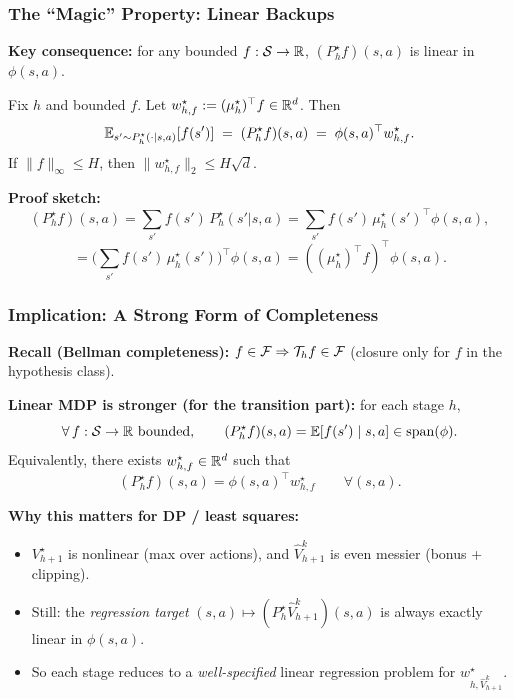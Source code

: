 \documentclass[aspectratio=169]{beamer}
\begin{document}
\begin{frame}\frametitle{The ``Magic'' Property: Linear Backups}

\small
\textbf{Key consequence:} for any bounded $f:\mathcal{S}\to\mathbb{R}$, $(P_h^\star f)(s,a)$ is linear in $\phi(s,a)$.

\vspace{0.03cm}
\begin{lemma}\label{lem:linearize_Pf_slides}
Fix $h$ and bounded $f$. Let $w_{h,f}^\star := (\mu_h^\star)^\top f\in\mathbb{R}^d$. Then
\[
\mathbb{E}_{s'\sim P_h^\star(\cdot\mid s,a)}[f(s')] \;=\; (P_h^\star f)(s,a)
\;=\;
\phi(s,a)^\top w_{h,f}^\star.
\]
If $\|f\|_\infty\le H$, then $\|w_{h,f}^\star\|_2\le H\sqrt d$.
\end{lemma}

\vspace{0.03cm}
\pause
\textbf{Proof sketch:}
\[
(P_h^\star f)(s,a)=\sum_{s'} f(s')\,P_h^\star(s'|s,a)
=\sum_{s'} f(s')\,\mu_h^\star(s')^\top \phi(s,a),
\]
\[
=\Big(\sum_{s'} f(s')\,\mu_h^\star(s')\Big)^\top \phi(s,a)
=( (\mu_h^\star)^\top f)^\top \phi(s,a).
\]

\end{frame}

\begin{frame}\frametitle{Implication: A Strong Form of Completeness}

\small
\textbf{Recall (Bellman completeness):}\;
$f\in\mathcal{F} \Rightarrow \mathcal{T}_h f \in \mathcal{F}$ \quad (closure only for $f$ in the hypothesis class).

\vspace{0.15cm}
\pause
\textbf{Linear MDP is stronger (for the transition part):}\;
for each stage $h$,
\[
\forall\, f:\Scal\to\R \ \text{bounded},\qquad
(P_h^\star f)(s,a)=\E[f(s')\mid s,a]\in \mathrm{span}(\phi).
\]
Equivalently, there exists $w_{h,f}^\star\in\mathbb{R}^d$ such that
\[
(P_h^\star f)(s,a)=\phi(s,a)^\top w_{h,f}^\star \qquad \forall (s,a).
\]

\vspace{0.15cm}
\pause
\textbf{Why this matters for DP / least squares:}
\begin{itemize}
  \item $V_{h+1}^\star$ is nonlinear (max over actions), and $\widehat V_{h+1}^k$ is even messier (bonus + clipping).
  \item \alert{Still:} the \emph{regression target} $(s,a)\mapsto (P_h^\star \widehat V_{h+1}^k)(s,a)$ is always exactly linear in $\phi(s,a)$.
  \item So each stage reduces to a \emph{well-specified} linear regression problem for $w_{h,\widehat V_{h+1}^k}^\star$.
\end{itemize}

\end{frame}
\end{document}
